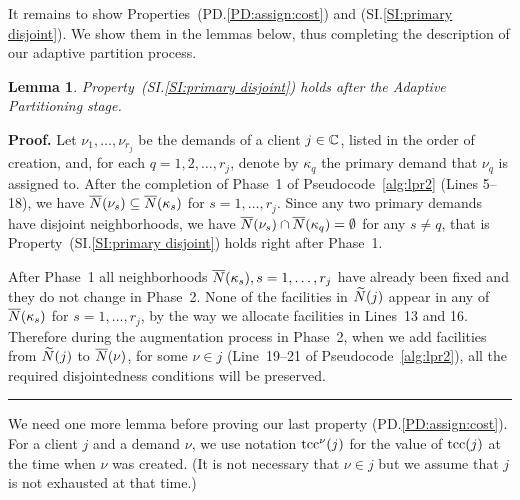 \documentclass[oneside,final]{ucr}
\newtheorem{lemma}[theorem]{Lemma}
\newenvironment{proof}[1][Proof]{\textbf{#1.} }{\ \rule{0.5em}{0.5em}}
\begin{document}
It remains to show Properties~(PD.\ref{PD:assign:cost}) and
(SI.\ref{SI:primary disjoint}). We show them in the lemmas
below, thus completing the description of our adaptive
partition process.


\begin{lemma}\label{lem: property SI:primary disjoint holds}
  Property~(SI.\ref{SI:primary disjoint}) holds after the
  Adaptive Partitioning stage.
\end{lemma}
\begin{proof}
  Let $\nu_1,\ldots,\nu_{r_j}$ be the demands of a client
  $j\in\mathbb{C}$, listed in the order of creation, and, for each
  $q=1,2,\ldots,r_j$, denote by $\kappa_q$ the primary demand that
  $\nu_q$ is assigned to. After the completion of Phase~1 of
  Pseudocode~\ref{alg:lpr2} (Lines 5--18), we have
  ${\overline{N}}(\nu_s)\subseteq {\overline{N}}(\kappa_s)$ for  $s=1,\ldots,r_j$. 
Since any two primary demands have disjoint
  neighborhoods, we have ${\overline{N}}(\nu_s) \cap {\overline{N}}(\kappa_q) =
  \emptyset$ for any $s\neq q$, that is
	Property~(SI.\ref{SI:primary disjoint}) holds right after Phase~1.

        After Phase~1 all neighborhoods ${\overline{N}}(\kappa_s),
        s=1,\ldots,r_j$ have already been fixed and they do not change
        in Phase~2.  None of the facilities in ${\widetilde N}(j)$ appear in
        any of ${\overline{N}}(\kappa_s)$ for $s=1,\ldots,r_j$, by the way we
        allocate facilities in Lines~13 and 16.  Therefore during the
        augmentation process in Phase~2, when we add facilities from
        ${\widetilde N}(j)$ to ${\overline{N}}(\nu)$, for some $\nu\in j$
        (Line~19--21 of Pseudocode~\ref{alg:lpr2}), all the required
        disjointedness conditions will be preserved.
\end{proof}


We need one more lemma before proving our last property
(PD.\ref{PD:assign:cost}).  For a client $j$ and a demand
$\nu$, we use notation $\mbox{\rm{tcc}}^{\nu}(j)$ for the value of
$\mbox{\rm{tcc}}(j)$ at the time when $\nu$ was created. (It is not
necessary that $\nu\in j$ but we assume that $j$ is not
exhausted at that time.)
\end{document}
